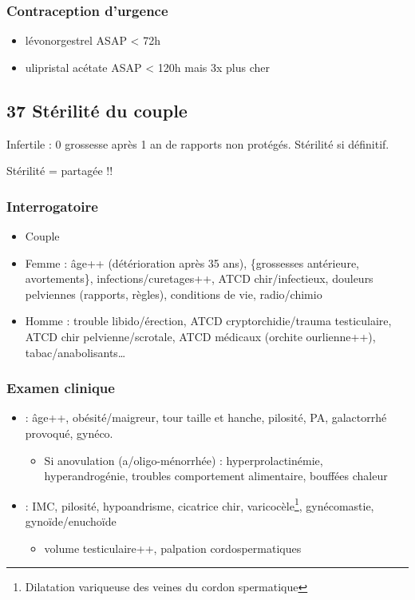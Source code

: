 \documentclass[11pt]{article}
\begin{document}
\subsubsection{Contraception d'urgence}
\label{sec:org3ff8664}
\begin{itemize}
\item lévonorgestrel ASAP < 72h
\item ulipristal acétate ASAP < 120h mais 3x plus cher
\end{itemize}

\subsection{37 \textdagger{} Stérilité du couple}
\label{sec:org2de2ca5}
Infertile : 0 grossesse après 1 an de rapports non protégés. Stérilité si
définitif.

Stérilité = partagée !!

\subsubsection{Interrogatoire}
\label{sec:org4c43b0a}
\begin{itemize}
\item Couple
\item Femme : âge++ (détérioration après 35 ans), \{grossesses antérieure,
avortements\}, infections/curetages++, ATCD chir/infectieux, douleurs
pelviennes (rapports, règles), conditions de vie, radio/chimio
\item Homme : trouble libido/érection, ATCD cryptorchidie/trauma testiculaire, ATCD
chir pelvienne/scrotale, ATCD médicaux (orchite ourlienne++), tabac/anabolisants\ldots{}
\end{itemize}

\subsubsection{Examen clinique}
\label{sec:org347b41d}
\begin{itemize}
\item \female : âge++, obésité/maigreur, tour taille et hanche, pilosité, PA,
galactorrhé provoqué, gynéco.
\begin{itemize}
\item Si anovulation (a/oligo-ménorrhée) : hyperprolactinémie, hyperandrogénie,
troubles comportement alimentaire, bouffées chaleur
\end{itemize}
\item \male : IMC, pilosité, hypoandrisme, cicatrice chir, varicocèle\footnote{Dilatation variqueuse des veines du cordon spermatique},
gynécomastie, gynoïde/enuchoïde
\begin{itemize}
\item volume testiculaire++, palpation cordospermatiques
\end{itemize}
\end{itemize}
\end{document}
